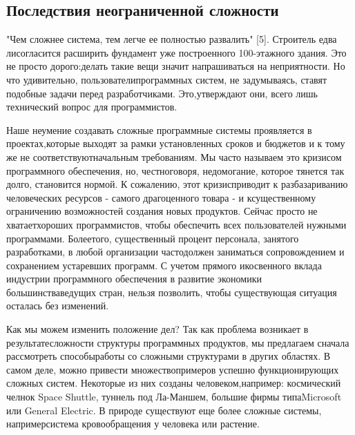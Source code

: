 \documentclass[10pt]{article}
\begin{document}
\subsection{Последствия неограниченной сложности}
"Чем сложнее система, тем легче ее полностью развалить" [5]. Строитель едва ли\linebreak согласится расширить фундамент уже построенного 100-этажного здания. Это не просто дорого:\linebreak делать такие вещи значит напрашиваться на неприятности. Но что удивительно, пользователи\linebreak программных систем, не задумываясь, ставят подобные задачи перед разработчиками. Это,\linebreak утверждают они, всего лишь технический вопрос для программистов. 

Наше неумение создавать сложные программные системы проявляется в проектах,\linebreak которые выходят за рамки установленных сроков и бюджетов и к тому же не соответствуют\linebreak начальным требованиям. Мы часто называем это кризисом программного обеспечения, но, честно\linebreak говоря, недомогание, которое тянется так долго, становится нормой. К сожалению, этот кризис\linebreak приводит к разбазариванию человеческих ресурсов - самого драгоценного товара - и к\linebreak существенному ограничению возможностей создания новых продуктов. Сейчас просто не хватает\linebreak хороших программистов, чтобы обеспечить всех пользователей нужными программами. Более\linebreak того, существенный процент персонала, занятого разработками, в любой организации часто\linebreak должен заниматься сопровождением и сохранением устаревших программ. С учетом прямого и\linebreak косвенного вклада индустрии программного обеспечения в развитие экономики большинства\linebreak ведущих стран, нельзя позволить, чтобы существующая ситуация осталась без изменений. 

Как мы можем изменить положение дел? Так как проблема возникает в результате\linebreak сложности структуры программных продуктов, мы предлагаем сначала рассмотреть способы\linebreak работы со сложными структурами в других областях. В самом деле, можно привести множество\linebreak примеров успешно функционирующих сложных систем. Некоторые из них созданы человеком,\linebreak например: космический челнок Space Shuttle, туннель под Ла-Маншем, большие фирмы типа\linebreak Microsoft или General Electric. В природе существуют еще более сложные системы, например\linebreak система кровообращения у человека или растение. 
\end{document}
